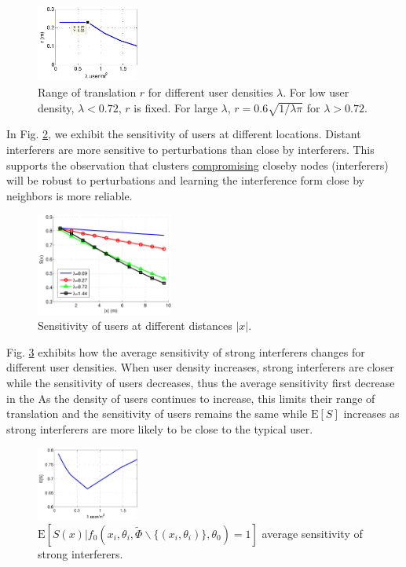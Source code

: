 \documentclass[10pt, conference, letterpaper]{IEEEtran}
\begin{document}
\begin{figure}
	\centering
	\includegraphics[width = 0.3\textwidth]{Channel_translation_range.pdf}
	\caption{Range of translation $r$ for different user densities $\lambda$. For low user density, $\lambda<0.72$, $r$ is fixed. For large $\lambda$, $r = 0.6 \sqrt{1/\lambda\pi}$ for $\lambda >0.72$.}
	\label{fig:Channel_translation_range}
\end{figure}

In Fig. \ref{fig:Channel_sensitivity}, we exhibit the sensitivity of users at different locations. Distant interferers are more sensitive to perturbations than close by interferers. This supports the observation that clusters \underline{compromising} closeby nodes (interferers) will be robust to perturbations and learning the interference form close by neighbors is more reliable. 

\begin{figure}
	\centering
	\includegraphics[width = 0.4\textwidth]{Channel_sensitivity.pdf}
	\caption{Sensitivity of users at different distances $|x|$.}
	\label{fig:Channel_sensitivity}
\end{figure}

Fig. \ref{fig:Channel_sensitivity_average} exhibits how the average sensitivity of strong interferers changes for different user densities. When user density increases, strong interferers are closer while the sensitivity of users decreases, thus the average sensitivity first decrease in the As the density of users continues to increase, this limits their range of translation and the sensitivity of users remains the same while $\mathrm{E}[S]$ increases as strong interferers are more likely to be close to the typical user. 

\begin{figure}
	\centering
	\includegraphics[width = 0.3\textwidth]{Channel_sensitivity_average.pdf}
	\caption{$\mathrm{E}[S(x)|f_0(x_i, \theta_i, \tilde{\Phi}\backslash\{(x_i,\theta_i)\}, \theta_0)=1]$ average sensitivity of strong interferers.}
	\label{fig:Channel_sensitivity_average}
\end{figure}
\end{document}
